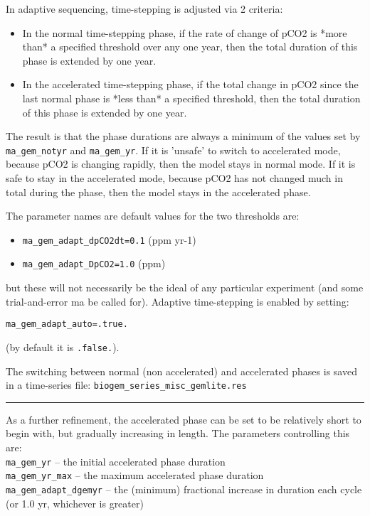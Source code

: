 \begin{enumerate}
In adaptive sequencing, time-stepping is adjusted via 2 criteria:
\begin{itemize}
\vspace{1mm}
        \item In the normal time-stepping phase, if the rate of change of pCO2 is *more than* a specified threshold over any one year, then the total duration of this phase is extended by one year.
\vspace{1mm}
        \item In the accelerated time-stepping phase, if the total change in pCO2 since the last normal phase is *less than* a specified threshold, then the total duration of this phase is extended by one year.
\end{itemize}
The result is that the phase durations are always a minimum of the values set by \texttt{ma\_gem\_notyr} and \texttt{ma\_gem\_yr}. If it is 'unsafe' to switch to accelerated mode, because pCO2 is changing rapidly, then the model stays in normal mode. If it is safe to stay in the accelerated mode, because pCO2 has not changed much in total during the phase, then the model stays in the accelerated phase.

The parameter names are default values for the two thresholds are:
\begin{itemize}
\vspace{1mm}
        \item \texttt{ma\_gem\_adapt\_dpCO2dt=0.1} (ppm yr-1)
\vspace{1mm}
        \item \texttt{ma\_gem\_adapt\_DpCO2=1.0} (ppm)
\end{itemize}
but these will not necessarily be the ideal of any particular experiment (and some trial-and-error ma be called for). Adaptive time-stepping is enabled by setting:
\vspace{-1mm}\small\begin{verbatim}
ma_gem_adapt_auto=.true.
\end{verbatim}\normalsize\vspace{-1mm}
(by default it is \texttt{.false.}).

The switching between normal (non accelerated) and accelerated phases is saved in a time-series file: \texttt{biogem\_series\_misc\_gemlite.res}

\vspace{1mm}
\noindent\rule{4cm}{0.5pt}
\vspace{2mm}

As a further refinement, the accelerated phase can be set to be relatively short to begin with, but gradually increasing in length. The parameters controlling this are:
\vspace{1mm}
\\\texttt{ma\_gem\_yr} -- the initial accelerated phase duration
\\\texttt{ma\_gem\_yr\_max} -- the maximum accelerated phase duration
\\\texttt{ma\_gem\_adapt\_dgemyr} -- the (minimum) fractional increase in duration each cycle (or 1.0 yr, whichever is greater)
\vspace{1mm}


\end{enumerate}
